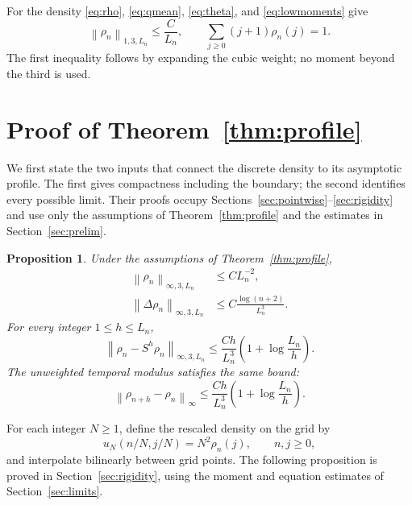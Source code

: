 \documentclass[11pt,letterpaper,reqno]{amsart}
\theoremstyle{plain}
\newtheorem{proposition}[theorem]{Proposition}
\newcommand{\norm}[1]{\left\lVert#1\right\rVert}
\begin{document}
For the density \eqref{eq:rho}, \eqref{eq:qmean}, \eqref{eq:theta}, and \eqref{eq:lowmoments} give
\begin{equation}\label{eq:weightedmass}
 \norm{\rho_n}_{1,3,L_n}\le\frac C{L_n},\qquad
 \sum_{j\ge0}(j+1)\rho_n(j)=1.
\end{equation}
The first inequality follows by expanding the cubic weight; no moment beyond the third is used.

\section{Proof of Theorem~\ref{thm:profile}}\label{sec:mainproof}
We first state the two inputs that connect the discrete density to its asymptotic profile. The first gives compactness including the boundary; the second identifies every possible limit. Their proofs occupy Sections~\ref{sec:pointwise}--\ref{sec:rigidity} and use only the assumptions of Theorem~\ref{thm:profile} and the estimates in Section~\ref{sec:prelim}.

\begin{proposition}\label{prop:smoothing}
Under the assumptions of Theorem~\ref{thm:profile},
\begin{align}
 \norm{\rho_n}_{\infty,3,L_n}&\le C L_n^{-2},\label{eq:sup}\\
 \norm{\Delta\rho_n}_{\infty,3,L_n}&\le C\frac{\log(n+2)}{L_n^3}.\label{eq:gradient}
\end{align}
For every integer $1\le h\le L_n$,
\begin{equation}\label{eq:spmod}
 \norm{\rho_n-S^h\rho_n}_{\infty,3,L_n}
 \le \frac{Ch}{L_n^3}\left(1+\log\frac{L_n}{h}\right).
\end{equation}
The unweighted temporal modulus satisfies the same bound:
\begin{equation}\label{eq:timemod}
 \norm{\rho_{n+h}-\rho_n}_{\infty}
 \le \frac{Ch}{L_n^3}\left(1+\log\frac{L_n}{h}\right).
\end{equation}
\end{proposition}

For each integer $N\ge1$, define the rescaled density on the grid by
\begin{equation}\label{eq:rescaled}
 u_N(n/N,j/N)=N^2\rho_n(j),\qquad n,j\ge0,
\end{equation}
and interpolate bilinearly between grid points. The following proposition is proved in Section~\ref{sec:rigidity}, using the moment and equation estimates of Section~\ref{sec:limits}.
\end{document}
